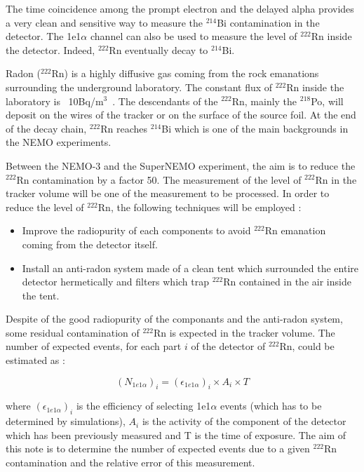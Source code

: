\documentclass[main.tex]{subfiles}
\begin{document}
\bigskip

\noindent The time coincidence among the prompt electron and the delayed alpha provides a very clean and sensitive way to measure the $^{214}$Bi contamination in the detector. The 1e1$\alpha$ channel can also be used to measure the level of $^{222}$Rn inside the detector. Indeed, $^{222}$Rn eventually decay to $^{214}$Bi.

\bigskip

\noindent Radon ($^{222}$Rn) is a highly diffusive gas coming from the rock emanations surrounding the underground laboratory. The constant flux of $^{222}$Rn inside the laboratory is ~10Bq/m$^3$~\cite{radon_at_LSM}. The descendants of the $^{222}$Rn, mainly the $^{218}$Po, will deposit on the wires of the tracker or on the surface of the source foil. At the end of the decay chain, $^{222}$Rn reaches $^{214}$Bi which is one of the main backgrounds in the NEMO experiments.

\bigskip

\noindent Between the NEMO-3 and the SuperNEMO experiment, the aim is to reduce the $^{222}$Rn contamination by a factor 50. The measurement of the level of $^{222}$Rn in the tracker volume will be one of the measurement to be processed. In order to reduce the level of $^{222}$Rn, the following techniques will be employed :
\begin{itemize}
\item Improve the radiopurity of each components to avoid $^{222}$Rn emanation coming from the detector itself.
\item Install an anti-radon system made of a clean tent which surrounded the entire detector hermetically and filters which trap $^{222}$Rn contained in the air inside the tent. 
\end{itemize}


\noindent Despite of the good radiopurity of the componants and the anti-radon system, some residual contamination of $^{222}$Rn is expected in the tracker volume. The number of expected events, for each part $i$ of the detector of $^{222}$Rn, could be estimated as :

\begin{equation}
(N_{1e1\alpha})_i = (\epsilon_{1e1\alpha})_i \times A_i \times T
\label{eq_number_of_expected_events}
\end{equation}

\noindent where $(\epsilon_{1e1\alpha})_i$ is the efficiency of selecting 1e1$\alpha$ events (which has to be determined by simulations), $A_i$ is the activity of the component of the detector which has been previously measured and T is the time of exposure. The aim of this note is to determine the number of expected events due to a given $^{222}$Rn contamination and the relative error of this measurement.
\end{document}
